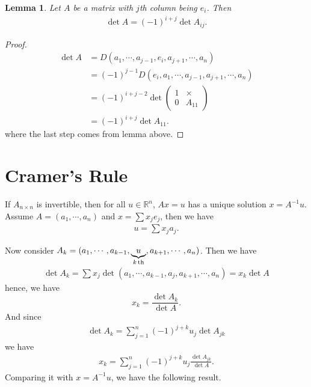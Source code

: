 \documentclass[11pt]{book}
\newtheorem{lemma}[theorem]{Lemma}
\theoremstyle{definition}
\numberwithin{equation}{subsection}
\begin{document}
\begin{lemma}
Let $A$ be a matrix with $j$th column being $e_i$. Then 
\begin{align*}
    \det A = (-1)^{i+j} \det A_{ij}.
\end{align*}
\end{lemma}
\begin{proof}
\begin{align*}
    \det A & = D(a_1,\cdots,a_{j-1}, e_i, a_{j+1}, \cdots, a_n) \\
    & = (-1)^{j-1} D(e_i, a_1,\cdots,a_{j-1}, a_{j+1}, \cdots, a_n) \\
    & = (-1)^{i+j-2} \det \left(
    \begin{matrix}
        1 & \times\\
        0 & A_{11}
    \end{matrix}
    \right) \\
    & = (-1)^{i+j} \det A_{11}.
\end{align*}
where the last step comes from lemma above. 
\end{proof}

\medskip

\section{Cramer's Rule}

If $A_{n\times n}$ is invertible, then for all $u\in\mathbb{R}^n$, $Ax = u$ has a unique solution $x = A^{-1}u$. Assume $A = (a_1, \cdots, a_n)$ and $x = \sum x_j e_j$, then we have 
\begin{align*}
    u = \sum x_j a_j.
\end{align*}

Now consider $A_k = (a_1, \cdots, a_{k-1}, \underbrace{u}_{k\,{\rm th}}, a_{k+1}, \cdots, a_n)$. Then we have 
\begin{align*}
    \det A_k = \sum x_j \det (a_1, \cdots, a_{k-1}, a_j, a_{k+1}, \cdots, a_n) = x_k \det A
\end{align*}
hence, we have
$$x_k = \frac{\det A_k}{\det A}.$$
And since 
\begin{align*}
    \det A_k = \sum^n_{j=1} (-1)^{j+k} u_j \det A_{jk}
\end{align*}
we have 
\begin{align*}
    x_k = \sum^n_{j=1} (-1)^{j+k} u_j \frac{\det A_{jk}}{\det A}.
\end{align*}
Comparing it with $x = A^{-1} u$, we have the following result.

\medskip
\end{document}
